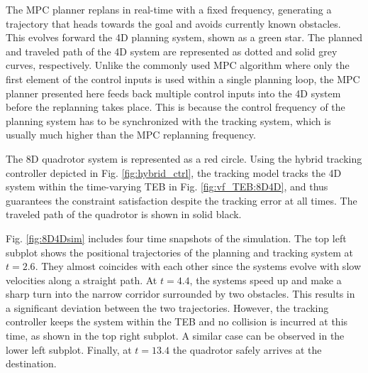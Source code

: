 The MPC planner replans in real-time with a fixed frequency, generating a trajectory that heads towards the goal and avoids currently known obstacles. This evolves forward the 4D planning system, shown as a green star. The planned and traveled path of the 4D system are represented as dotted and solid grey curves, respectively. Unlike the commonly used MPC algorithm where only the first element of the control inputs is used within a single planning loop, the MPC planner presented here feeds back multiple control inputs into the 4D system before the replanning takes place. This is because the control frequency of the planning system has to be synchronized with the tracking system, which is usually much higher than the MPC replanning frequency.

The 8D quadrotor system is represented as a red circle. Using the hybrid tracking controller depicted in Fig. \ref{fig:hybrid_ctrl}, the tracking model tracks the 4D system within the time-varying TEB in Fig. \ref{fig:vf_TEB:8D4D}, and thus guarantees the constraint satisfaction despite the tracking error at all times. The traveled path of the quadrotor is shown in solid black.

Fig. \ref{fig:8D4Dsim} includes four time snapshots of the simulation. The top left subplot shows the positional trajectories of the planning and tracking system at $t=2.6$. They almost coincides with each other since the systems evolve with slow velocities along a straight path. At $t=4.4$, the systems speed up and make a sharp turn into the narrow corridor surrounded by two obstacles. This results in a significant deviation between the two trajectories. However, the tracking controller keeps the system within the TEB and no collision is incurred at this time, as shown in the top right subplot. A similar case can be observed in the lower left subplot. Finally, at $t=13.4$ the quadrotor safely arrives at the destination.

